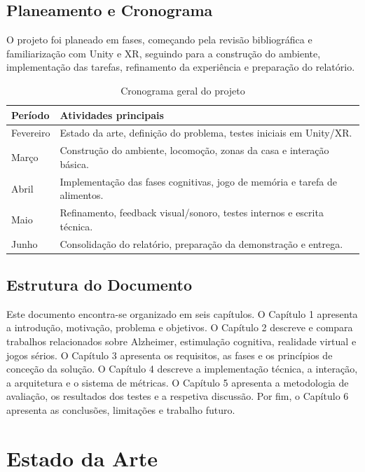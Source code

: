 \documentclass[12pt,a4paper,oneside]{report}
\newcommand{\blankpage}{
    \clearpage
    \thispagestyle{empty}
    \null
    \clearpage
}
\begin{document}
\section{Planeamento e Cronograma}

O projeto foi planeado em fases, começando pela revisão bibliográfica e familiarização com Unity e \ac{XR}, seguindo para a construção do ambiente, implementação das tarefas, refinamento da experiência e preparação do relatório.

\begin{table}[H]
\centering
\caption{Cronograma geral do projeto}
\begin{tabular}{p{3cm}p{10cm}}
\toprule
\textbf{Período} & \textbf{Atividades principais} \\
\midrule
Fevereiro & Estado da arte, definição do problema, testes iniciais em Unity/XR. \\
Março & Construção do ambiente, locomoção, zonas da casa e interação básica. \\
Abril & Implementação das fases cognitivas, jogo de memória e tarefa de alimentos. \\
Maio & Refinamento, feedback visual/sonoro, testes internos e escrita técnica. \\
Junho & Consolidação do relatório, preparação da demonstração e entrega. \\
\bottomrule
\end{tabular}
\end{table}

\section{Estrutura do Documento}

Este documento encontra-se organizado em seis capítulos. O Capítulo 1 apresenta a introdução, motivação, problema e objetivos. O Capítulo 2 descreve e compara trabalhos relacionados sobre Alzheimer, estimulação cognitiva, realidade virtual e jogos sérios. O Capítulo 3 apresenta os requisitos, as fases e os princípios de conceção da solução. O Capítulo 4 descreve a implementação técnica, a interação, a arquitetura e o sistema de métricas. O Capítulo 5 apresenta a metodologia de avaliação, os resultados dos testes e a respetiva discussão. Por fim, o Capítulo 6 apresenta as conclusões, limitações e trabalho futuro.

\blankpage

\chapter{Estado da Arte}
\end{document}
